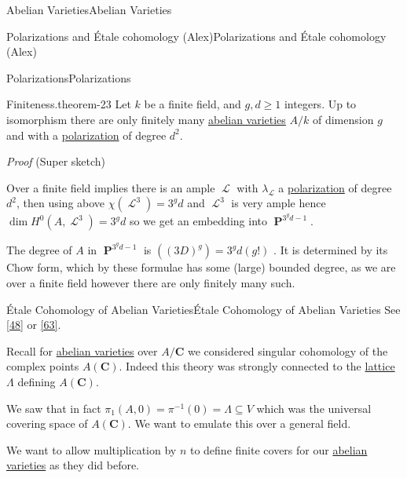 \documentclass[10pt,]{book}
\makeatletter
\renewcommand*{\proofname}{Proof}
\renewenvironment{proof}[1][\proofname]{\par
  \pushQED{\qed}%
  \normalfont \topsep6\p@\@plus6\p@\relax
  \trivlist
  \item\relax
    {\itshape
    #1\@addpunct{.}}\hspace\labelsep\ignorespaces
}{%
  \popQED\endtrivlist\@endpefalse
}
\numberwithin{equation}{section}
\newcommand{\sheaf}[1]{\operatorname{\mathcal{#1}}}
\newcommand{\CC}{\mathbf{C}}
\DeclareMathOperator{\PP}{\mathbf{P}}
\makeatother
\begin{document}
\begin{chapterptx}{Abelian Varieties}{}{Abelian Varieties}{}{}
\begin{sectionptx}{Polarizations and Étale cohomology (Alex)}{}{Polarizations and Étale cohomology (Alex)}{}{}
\begin{subsectionptx}{Polarizations}{}{Polarizations}{}{}
\begin{theorem}{Finiteness.}{}{theorem-23}%
\hypertarget{p-258}{}%
Let \(k\) be a finite field, and   \(g,d\ge 1\) integers. Up to isomorphism there are only finitely many \hyperref[def-buntes-abvar]{abelian varieties} \(A/k\) of dimension \(g\) and with a \hyperref[def-polarization]{polarization} of degree \(d^2\).%
\end{theorem}
\begin{proof}\hypertarget{proof-45}{}
\hypertarget{p-259}{}%
(Super sketch)%
\par
\hypertarget{p-260}{}%
Over a finite field implies there is an ample \(\sheaf L\) with \(\lambda_{\sheaf L}\) a \hyperref[def-polarization]{polarization} of degree \(d^2\), then using above \(\chi(\sheaf L^3) = 3^g d\) and \(\sheaf L^3\) is very ample hence \(\dim H^0(A, \sheaf L^3) = 3^g d\) so we get an embedding into \(\PP^{3^g d - 1}\).%
\par
\hypertarget{p-261}{}%
The degree of \(A\) in \(\PP^{3^g d - 1}\) is \(((3D)^g) = 3^g d(g!)\) . It is determined by its Chow form, which by these formulae has some (large) bounded degree, as we are over a finite field however there are only finitely many such.%
\end{proof}
\end{subsectionptx}
%
%
\typeout{************************************************}
\typeout{************************************************}
%
\begin{subsectionptx}{Étale Cohomology of Abelian Varieties}{}{Étale Cohomology of Abelian Varieties}{}{}\label{subsection-27}
\hypertarget{p-262}{}%
See \hyperlink{bib-milne-etale}{[48]} or \hyperlink{bib-tamme}{[63]}.%
\par
\hypertarget{p-263}{}%
Recall for \hyperref[def-buntes-abvar]{abelian varieties} over \(A/\CC\) we considered singular cohomology of the complex points \(A(\CC)\). Indeed this theory was strongly connected to the \hyperref[def-buntes-lattice]{lattice} \(\Lambda\) defining \(A(\CC)\).%
\par
\hypertarget{p-264}{}%
We saw that in fact \(\pi_1(A,0) = \pi^{-1} (0) = \Lambda \subseteq V\) which was the universal covering space of \(A(\CC)\). We want to emulate this over a general field.%
\par
\hypertarget{p-265}{}%
We want to allow multiplication by \(n\) to define finite covers for our \hyperref[def-buntes-abvar]{abelian varieties} as they did before.%
\par

\end{subsectionptx}
\end{sectionptx}
\end{chapterptx}
\end{document}
